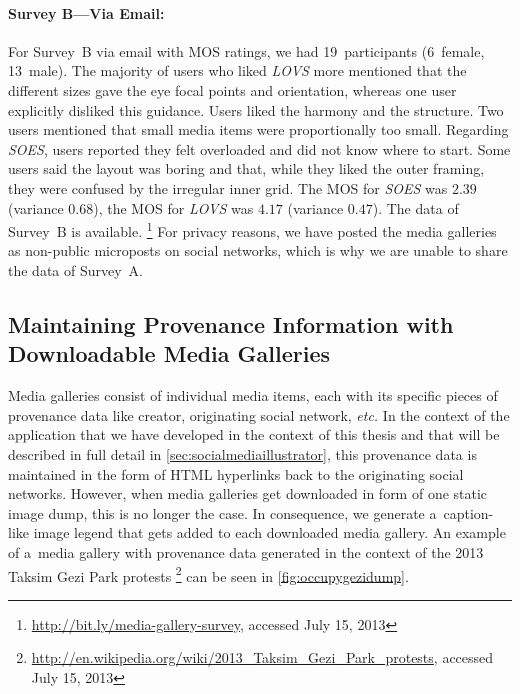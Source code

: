 \paragraph{Survey B---Via Email:}

For Survey~B via email with MOS ratings,
we had 19~participants (6~female, 13~male).
The majority of users who liked \emph{LOVS} more
mentioned that the different sizes
gave the eye focal points and orientation,
whereas one user explicitly disliked this guidance.
Users liked the harmony and the structure.
Two users mentioned that small media items were proportionally too small.
Regarding \emph{SOES}, users reported they felt overloaded
and did not know where to start.
Some users said the layout was boring and that,
while they liked the outer framing,
they were confused by the irregular inner grid.
The MOS for \emph{SOES} was $2.39$ (variance $0.68$),
the MOS for \emph{LOVS} was $4.17$ (variance $0.47$).
The data of Survey~B is available.%
\footnote{\url{http://bit.ly/media-gallery-survey},
accessed July 15, 2013}
For privacy reasons, we have posted the media galleries
as non-public microposts on social networks,
which is why we are unable to share the data of Survey~A.

\subsection[Maintaining Provenance Information with Media Galleries]{Maintaining Provenance Information with Downloadable Media Galleries}

Media galleries consist of individual media items,
each with its specific pieces of provenance data
like creator, originating social network, \emph{etc.}
In the context of the application that we have developed
in the context of this thesis and
that will be described in full detail in \autoref{sec:socialmediaillustrator},
this provenance data is maintained in the form of HTML hyperlinks
back to the originating social networks.
However, when media galleries get downloaded in form of
one static image dump, this is no longer the case.
In consequence, we generate a~caption-like image legend
that gets added to each downloaded media gallery.
An example of a~media gallery with provenance data
generated in the context of the 2013 Taksim Gezi Park protests%
\footnote{\url{http://en.wikipedia.org/wiki/2013_Taksim_Gezi_Park_protests},
accessed July 15, 2013}
can be seen in \autoref{fig:occupygezidump}.

